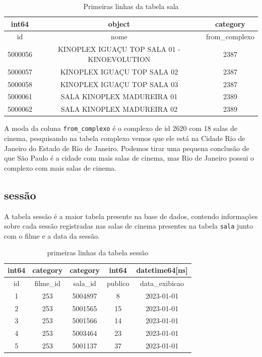 \documentclass[12pt, a4paper]{article}
\begin{document}
\begin{table}[h]
    \centering
    \begin{tabular}{c|c|c}
    int64 & object & category\\
    \hline
    id&                                         nome& from\_complexo\\
    \hline
  5000056&  KINOPLEX IGUAÇU TOP SALA 01 - KINOEVOLUTION&          2387\\
  5000057&                  KINOPLEX IGUAÇU TOP SALA 02&          2387\\
  5000058&                  KINOPLEX IGUAÇU TOP SALA 03&          2387\\
  5000061&                   SALA KINOPLEX MADUREIRA 01&          2389\\
  5000062 &                  SALA KINOPLEX MADUREIRA 02&          2389\\
    \end{tabular}
    \caption{Primeiras linhas da tabela sala}
    \label{tab:Sala}
\end{table}

A moda da coluna \texttt{from\_complexo} é o complexo de id 2620 com 18 salas de cinema, pesquisando na tabela complexo vemos que ele está na Cidade Rio de Janeiro do Estado de Rio de Janeiro. Podemos tirar uma pequena conclusão de que São Paulo é a cidade com mais salas de cinema, mas Rio de Janeiro possui o complexo com mais salas de cinema.

\subsection{sessão}

A tabela sessão é a maior tabela presente na base de dados, contendo informações sobre cada sessão registradas nas salas de cinema presentes na tabela \texttt{sala} junto com o filme e a data da sessão.

\begin{table}[h]
    \centering
    \begin{tabular}{c|c|c|c|c}
    int64 & category & category & int64 & datetime64[ns]\\
    \hline
    id& filme\_id&  sala\_id&  publico& data\_exibicao\\
    \hline
   1&      253&  5004897&        8&    2023-01-01\\
   2&      253&  5001565&       15&    2023-01-01\\
   3&      253&  5001566&       14&    2023-01-01\\
   4&      253&  5003464&       23&    2023-01-01\\
   5&      253&  5001137&       37&    2023-01-01\\
    \end{tabular}
    \caption{primeiras linhas da tabela sessão}
    \label{tab:sessao}
\end{table}
\end{document}
